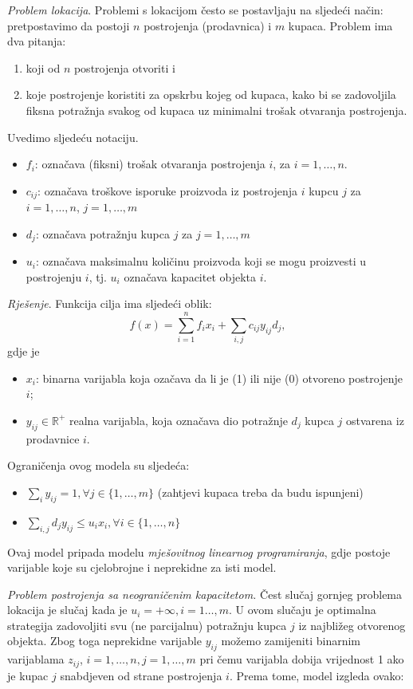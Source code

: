 \documentclass[a4paper, utf8, 11pt, colorlinks]{article}
\begin{document}
\emph{Problem lokacija}. Problemi s lokacijom često se postavljaju na sljedeći način: pretpostavimo da postoji $n$ postrojenja (prodavnica)  i  $m$ kupaca. Problem ima dva pitanja:
\begin{enumerate}
    \item koji od $n$ postrojenja otvoriti i
     \item koje  postrojenje koristiti za opskrbu kojeg od kupaca, kako bi se zadovoljila fiksna potražnja svakog od kupaca   uz minimalni trošak otvaranja postrojenja.
\end{enumerate}
Uvedimo sljedeću notaciju.
\begin{itemize}
    \item  $f_{i}$: označava (fiksni) trošak otvaranja postrojenja $i$, za  $ i = 1,  \ldots, n$. 
    \item $c_{ij}$: označava troškove isporuke proizvoda iz postrojenja $i$ kupcu $j$ za $i = 1, \ldots, n$, $j = 1,  \ldots, m$
    \item $d_{j}$: označava potražnju kupca $j$ za $j = 1, \ldots, m$
    \item $u_{i}$: označava maksimalnu količinu proizvoda koji se mogu proizvesti u postrojenju $i$, tj. $u_{i}$ označava kapacitet objekta $i$.
\end{itemize}

\emph{Rješenje}. Funkcija cilja ima sljedeći oblik:
$$ f(x) = \sum_{i=1}^n f_i x_i  + \sum_{i,j} c_{ij} y_{ij} d_j,$$
gdje je
\begin{itemize}
    \item $x_i$: binarna varijabla koja ozačava da li je (1) ili nije (0) otvoreno postrojenje $i$;
    \item $y_{ij} \in \mathbb{R}^+$ realna varijabla, koja označava dio potražnje $d_j$ kupca $j$ ostvarena iz prodavnice $i$.
\end{itemize}
Ograničenja ovog modela su sljedeća:
\begin{itemize}
    \item $\sum_{i} y_{ij} = 1, \forall j\in\{1,\ldots,m\}$ (zahtjevi kupaca treba da budu ispunjeni)
    \item $\sum_{i,j} d_j y_{ij} \leq u_i x_i, \forall i \in \{1,\ldots,n\}$
\end{itemize}
Ovaj model pripada modelu \emph{mješovitnog linearnog programiranja}, gdje postoje varijable koje su cjelobrojne i neprekidne za isti model.

\emph{Problem postrojenja sa neograničenim kapacitetom.}
Čest slučaj gornjeg problema lokacija je slučaj kada je  $ u_{i} = + \infty,i=1\ldots,m$. U ovom slučaju je   optimalna strategija zadovoljiti svu (ne parcijalnu) potražnju kupca $j$ iz najbližeg otvorenog objekta. Zbog toga neprekidne varijable  $y_{ij}$ možemo zamijeniti binarnim varijablama $z_{ij}$, $i=1,\ldots,n, j=1,\ldots,m$ pri čemu varijabla dobija vrijednost 1 ako je kupac $j$ snabdjeven od strane postrojenja $i$. Prema tome, model izgleda ovako:
\end{document}
